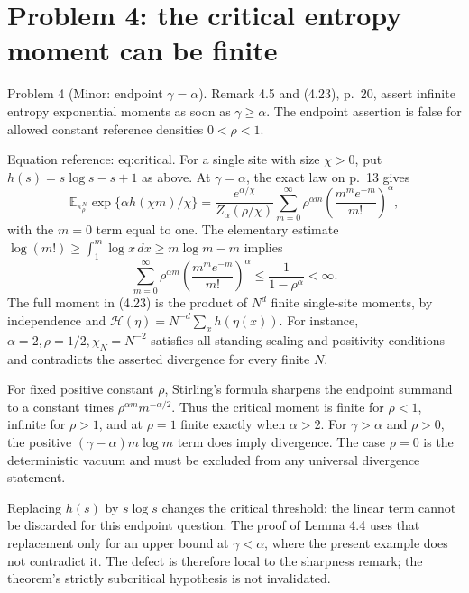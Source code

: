 \documentclass[10pt]{article}
\begin{document}
\section*{Problem 4: the critical entropy moment can be finite}
Problem 4 (Minor: endpoint \(\gamma=\alpha\)).  Remark 4.5 and (4.23), p. 20, assert infinite entropy exponential moments as soon as \(\gamma\ge\alpha\). The endpoint assertion is false for allowed constant reference densities \(0<\rho<1\).\par
Equation reference: eq:critical. For a single site with size \(\chi>0\), put \(h(s)=s\log s-s+1\) as above. At \(\gamma=\alpha\), the exact law on p. 13 gives \[
\mathbb E_{\pi_\rho^N}
 \exp\{\alpha h(\chi m)/\chi\}
=\frac{e^{\alpha/\chi}}{Z_\alpha(\rho/\chi)}
 \sum_{m=0}^{\infty}\rho^{\alpha m}
 \left(\frac{m^m e^{-m}}{m!}\right)^\alpha ,\] with the \(m=0\) term equal to one. The elementary estimate \(\log(m!)\ge\int_1^m\log x\,dx\ge m\log m-m\) implies \[\sum_{m=0}^{\infty}\rho^{\alpha m}
 \left(\frac{m^m e^{-m}}{m!}\right)^\alpha
 \le\frac1{1-\rho^\alpha}<\infty .\] The full moment in (4.23) is the product of \(N^d\) finite single-site moments, by independence and \(\mathcal H(\eta)=N^{-d}\sum_xh(\eta(x))\). For instance, \(\alpha=2,\rho=1/2,\chi_N=N^{-2}\) satisfies all standing scaling and positivity conditions and contradicts the asserted divergence for every finite \(N\).\par
For fixed positive constant \(\rho\), Stirling’s formula sharpens the endpoint summand to a constant times \(\rho^{\alpha m}m^{-\alpha/2}\). Thus the critical moment is finite for \(\rho<1\), infinite for \(\rho>1\), and at \(\rho=1\) finite exactly when \(\alpha>2\). For \(\gamma>\alpha\) and \(\rho>0\), the positive \((\gamma-\alpha)m\log m\) term does imply divergence. The case \(\rho=0\) is the deterministic vacuum and must be excluded from any universal divergence statement.\par
Replacing \(h(s)\) by \(s\log s\) changes the critical threshold: the linear term cannot be discarded for this endpoint question. The proof of Lemma 4.4 uses that replacement only for an upper bound at \(\gamma<\alpha\), where the present example does not contradict it. The defect is therefore local to the sharpness remark; the theorem’s strictly subcritical hypothesis is not invalidated.\par
\end{document}
